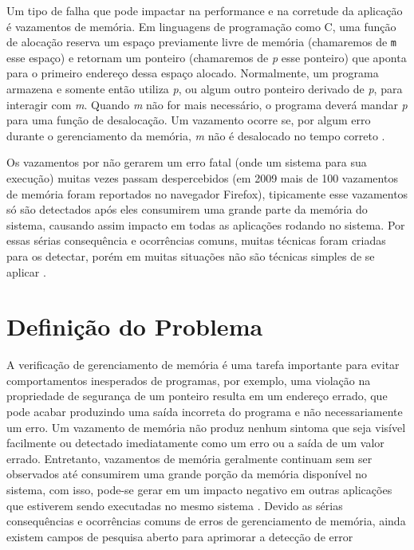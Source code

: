 Um tipo de falha que pode impactar na performance e na corretude da aplicação é vazamentos de
memória. Em linguagens de programação como C, uma função de alocação reserva um espaço
previamente livre de memória (chamaremos de \texttt{m} esse espaço) e retornam um ponteiro 
(chamaremos de \textit{p} esse ponteiro) que aponta para o primeiro endereço dessa espaço
alocado. Normalmente, um programa armazena e somente então utiliza \textit{p}, ou algum outro
ponteiro derivado de \textit{p}, para interagir com \textit{m}. Quando \textit{m} não for mais
necessário, o programa deverá mandar \textit{p} para uma função de desalocação. Um vazamento
ocorre se, por algum erro durante o gerenciamento da memória, \textit{m} não é desalocado no
tempo correto \cite{Clause:2010}.

Os vazamentos por não gerarem um erro fatal (onde um sistema para sua execução) muitas vezes 
passam despercebidos (em 2009 mais de 100 vazamentos de memória foram reportados no navegador
Firefox), tipicamente esse vazamentos só são detectados após eles consumirem uma grande parte
da memória do sistema, causando assim impacto em todas as aplicações rodando no sistema. 
Por essas sérias consequência e ocorrências comuns, muitas técnicas foram criadas para os
detectar, porém em muitas situações não são técnicas simples de se aplicar \cite{Clause:2010}.



\section{Definição do Problema}
A verificação de gerenciamento de memória é uma tarefa importante para evitar comportamentos inesperados de programas, por exemplo, uma violação na propriedade de segurança de um ponteiro resulta em um endereço errado, que pode acabar produzindo uma saída incorreta do programa e não necessariamente um erro. Um vazamento de memória não produz nenhum sintoma que seja visível facilmente ou detectado imediatamente como um erro ou a saída de um valor errado. Entretanto, vazamentos de memória geralmente continuam sem ser observados até consumirem uma grande porção da memória disponível no sistema, com isso, pode-se gerar em um impacto negativo em outras aplicações que estiverem sendo executadas no mesmo sistema \cite{Clause:2010}. Devido as sérias consequências e ocorrências comuns de erros de gerenciamento de memória, ainda existem campos de pesquisa aberto para aprimorar a detecção de error \cite{Rocha:2015tese}

